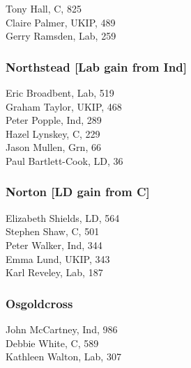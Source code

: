 \documentclass[a4paper,openany,10pt]{book}
\begin{document}


Tony Hall, C, 825\\
Claire Palmer, UKIP, 489\\
Gerry Ramsden, Lab, 259\\


\subsubsection*{Northstead \hspace*{\fill}\nolinebreak[1]%
\enspace\hspace*{\fill}
[Lab gain from Ind]}



Eric Broadbent, Lab, 519\\
Graham Taylor, UKIP, 468\\
Peter Popple, Ind, 289\\
Hazel Lynskey, C, 229\\
Jason Mullen, Grn, 66\\
Paul Bartlett-Cook, LD, 36\\


\subsubsection*{Norton \hspace*{\fill}\nolinebreak[1]%
\enspace\hspace*{\fill}
[LD gain from C]}



Elizabeth Shields, LD, 564\\
Stephen Shaw, C, 501\\
Peter Walker, Ind, 344\\
Emma Lund, UKIP, 343\\
Karl Reveley, Lab, 187\\


\subsubsection*{Osgoldcross}



John McCartney, Ind, 986\\
Debbie White, C, 589\\
Kathleen Walton, Lab, 307\\
\end{document}
